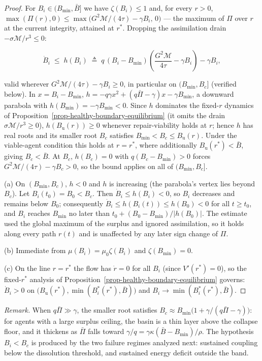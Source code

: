 \documentclass[11pt]{article}
\theoremstyle{plain}
\theoremstyle{definition}
\theoremstyle{remark}
\begin{document}
\begin{proof}
For $B_i \in (B_{\min}, \bar{B}]$ we have $\zeta(B_i) \leq 1$ and, for every $r > 0$, $\max(\Pi(r), 0) \leq \max\bigl(G^2\mathcal{M}/(4\tau) - \gamma B_i,\, 0\bigr)$ — the maximum of $\Pi$ over $r$ at the current integrity, attained at $r^*$. Dropping the assimilation drain $-\sigma\mathcal{M}/r^3 \leq 0$:

$$\dot{B}_i \;\leq\; h(B_i) \;\triangleq\; q\,(B_i - B_{\min})\left(\frac{G^2\mathcal{M}}{4\tau} - \gamma B_i\right) - \gamma B_i,$$

valid wherever $G^2\mathcal{M}/(4\tau) - \gamma B_i \geq 0$, in particular on $(B_{\min}, B_c]$ (verified below). In $x = B_i - B_{\min}$, $h = -q\gamma x^2 + (q\bar{\Pi} - \gamma)x - \gamma B_{\min}$, a downward parabola with $h(B_{\min}) = -\gamma B_{\min} < 0$. Since $h$ dominates the fixed-$r$ dynamics of Proposition~\ref{prop-healthy-boundary-equilibrium} (it omits the drain $\sigma\mathcal{M}/r^3 \geq 0$), $h(B_{\mathrm{u}}(r)) \geq 0$ whenever repair-viability holds at $r$; hence $h$ has real roots and its smaller root $B_c$ satisfies $B_{\min} < B_c \leq B_{\mathrm{u}}(r)$. Under the viable-agent condition this holds at $r = r^*$, where additionally $B_{\mathrm{u}}(r^*) < \bar{B}$, giving $B_c < \bar{B}$. At $B_c$, $h(B_c) = 0$ with $q(B_c - B_{\min}) > 0$ forces $G^2\mathcal{M}/(4\tau) - \gamma B_c > 0$, so the bound applies on all of $(B_{\min}, B_c]$.

(a) On $(B_{\min}, B_c)$, $h < 0$ and $h$ is increasing (the parabola's vertex lies beyond $B_c$). Let $B_i(t_0) = B_0 < B_c$. Then $\dot{B}_i \leq h(B_i) < 0$, so $B_i$ decreases and remains below $B_0$; consequently $\dot{B}_i \leq h(B_i(t)) \leq h(B_0) < 0$ for all $t \geq t_0$, and $B_i$ reaches $B_{\min}$ no later than $t_0 + (B_0 - B_{\min})/|h(B_0)|$. The estimate used the global maximum of the surplus and ignored assimilation, so it holds along every path $r(t)$ and is unaffected by any later sign change of $\Pi$.

(b) Immediate from $\mu(B_i) = \mu_0 \zeta(B_i)$ and $\zeta(B_{\min}) = 0$.

(c) On the line $r = r^*$ the flow has $\dot{r} = 0$ for all $B_i$ (since $V'(r^*) = 0$), so the fixed-$r^*$ analysis of Proposition~\ref{prop-healthy-boundary-equilibrium} governs: $\dot{B}_i > 0$ on $\bigl(B_{\mathrm{u}}(r^*), \min(B_i^*(r^*), \bar{B})\bigr)$ and $B_i \to \min(B_i^*(r^*), \bar{B})$.
\end{proof}

\emph{Remark.} When \(q\bar{\Pi} \gg \gamma\), the smaller root
satisfies
\(B_c \approx B_{\min}\bigl(1 + \gamma/(q\bar{\Pi} - \gamma)\bigr)\):
for agents with a large surplus ceiling, the basin is a thin layer above
the collapse floor, and it thickens as \(\bar{\Pi}\) falls toward
\(\gamma/q = \gamma\kappa(\bar{B} - B_{\min})/\rho\). The hypothesis
\(B_i < B_c\) is produced by the two failure regimes analyzed next:
sustained coupling below the dissolution threshold, and sustained energy
deficit outside the band.
\end{document}
